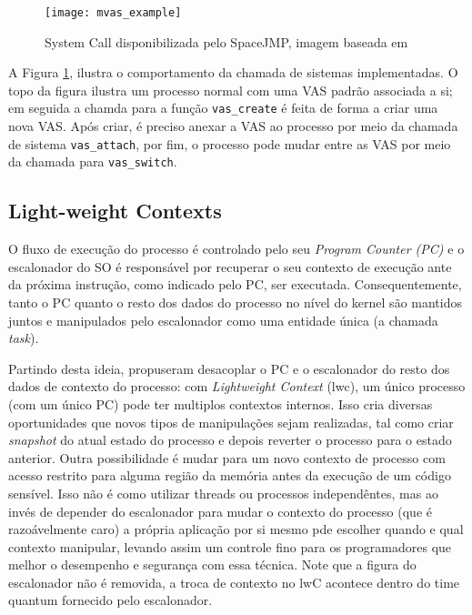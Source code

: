 \begin{figure}[!h]
  \centering
  \texttt{[image: mvas\_example]} 
  \caption{System Call disponibilizada pelo SpaceJMP, imagem baseada em \cite{ellarge}}
  \label{fig:mvas_example}
\end{figure}

A Figura \ref{fig:mvas_example}, ilustra o comportamento da chamada de sistemas
implementadas. O topo da figura ilustra um processo normal com uma VAS padrão
associada a si; em seguida a chamda para a função \texttt{vas\_create} é feita
de forma a criar uma nova VAS. Após criar, é preciso anexar a VAS ao processo
por meio da chamada de sistema \texttt{vas\_attach}, por fim, o processo pode
mudar entre as VAS por meio da chamada para \texttt{vas\_switch}.

\subsection{Light-weight Contexts}

O fluxo de execução do processo é controlado pelo seu \emph{Program Counter
(PC)} e o escalonador do SO é responsável por recuperar o seu contexto de
execução ante da próxima instrução, como indicado pelo PC, ser executada.
Consequentemente, tanto o PC quanto o resto dos dados do processo no nível do
kernel são mantidos juntos e manipulados pelo escalonador como uma entidade
única (a chamada \emph{task}).

Partindo desta ideia, \cite{litton} propuseram desacoplar o PC e o escalonador
do resto dos dados de contexto do processo: com \emph{Lightweight Context}
(lwc), um único processo (com um único PC) pode ter multiplos contextos
internos. Isso cria diversas oportunidades que novos tipos de manipulações
sejam realizadas, tal como criar \emph{snapshot} do atual estado do processo e
depois reverter o processo para o estado anterior. Outra possibilidade é mudar
para um novo contexto de processo com acesso restrito para alguma região da
memória antes da execução de um código sensível. Isso não é como utilizar
threads ou processos independêntes, mas ao invés de depender do escalonador
para mudar o contexto do processo (que é razoávelmente caro) a própria
aplicação por si mesmo pde escolher quando e qual contexto manipular, levando
assim um controle fino para os programadores que melhor o desempenho e
segurança com essa técnica. Note que a figura do escalonador não é removida, a
troca de contexto no lwC acontece dentro do time quantum fornecido pelo
escalonador.

